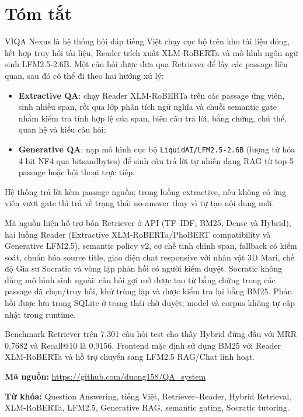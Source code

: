 \documentclass[12pt,a4paper,oneside]{report}
\newcommand{\code}[1]{\texttt{#1}}
\begin{document}
\chapter*{Tóm tắt}
VIQA Nexus là hệ thống hỏi đáp tiếng Việt chạy cục bộ trên kho tài liệu đóng, kết hợp
truy hồi tài liệu, Reader trích xuất XLM-RoBERTa và mô hình ngôn ngữ sinh LFM2.5-2.6B.
Một câu hỏi được đưa qua Retriever để lấy các passage liên quan, sau đó có thể đi theo
hai hướng xử lý:
\begin{itemize}
  \item \textbf{Extractive QA}: chạy Reader XLM-RoBERTa trên các passage ứng viên, sinh nhiều
  span, rồi qua lớp phân tích ngữ nghĩa và chuỗi semantic gate nhằm kiểm tra tính hợp lệ
  của span, biên câu trả lời, bằng chứng, chủ thể, quan hệ và kiểu câu hỏi;
  \item \textbf{Generative QA}: nạp mô hình cục bộ \code{LiquidAI/LFM2.5-2.6B} (lượng tử hóa
  4-bit NF4 qua bitsandbytes) để sinh câu trả lời tự nhiên dạng RAG từ top-5 passage hoặc
  hội thoại trực tiếp.
\end{itemize}
Hệ thống trả lời kèm passage nguồn; trong luồng extractive, nếu không có ứng viên vượt gate
thì trả về trạng thái no-answer thay vì tự tạo nội dung mới.

Mã nguồn hiện hỗ trợ bốn Retriever ở API (TF--IDF, BM25, Dense và Hybrid), hai luồng Reader
(Extractive XLM-RoBERTa/PhoBERT compatibility và Generative LFM2.5), semantic policy v2,
cơ chế tinh chỉnh span, fallback có kiểm soát, chuẩn hóa source title, giao diện chat
responsive với nhân vật 3D Mari, chế độ Gia sư Socratic và vòng lặp phản hồi có người kiểm duyệt.
Socratic không dùng mô hình sinh ngoài: câu hỏi gợi mở được tạo từ bằng chứng trong các
passage đã chọn/truy hồi, khử trùng lặp và được kiểm tra lại bằng BM25. Phản hồi được lưu
trong SQLite ở trạng thái chờ duyệt; model và corpus không tự cập nhật trong runtime.

Benchmark Retriever trên 7.301 câu hỏi test cho thấy Hybrid đứng đầu với MRR 0,7682 và
Recall@10 là 0,9156. Frontend mặc định sử dụng BM25 với Reader XLM-RoBERTa và hỗ trợ chuyển
sang LFM2.5 RAG/Chat linh hoạt.

\noindent\textbf{Mã nguồn:} \url{https://github.com/duong158/QA_system}

\noindent\textbf{Từ khóa:} Question Answering, tiếng Việt, Retriever--Reader,
Hybrid Retrieval, XLM-RoBERTa, LFM2.5, Generative RAG, semantic gating, Socratic tutoring.
\end{document}

